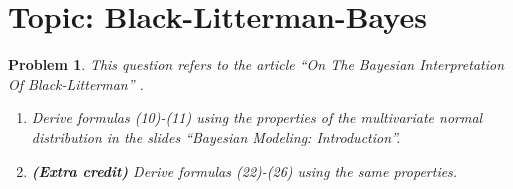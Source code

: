 \documentclass[11pt]{article}
\theoremstyle{plain} %
\newtheorem{problem}[theorem]{Problem}
\theoremstyle{remark}
\begin{document}
\section{Topic: Black-Litterman-Bayes}
\begin{problem}
This question refers to the article ``On The Bayesian Interpretation Of
Black-Litterman'' \cite{Kolm2017}.
\begin{enumerate}[label=(\alph*)]
  \item Derive formulas (10)-(11) using the properties of the multivariate
        normal distribution in the slides ``Bayesian Modeling: Introduction''.
  \item \textbf{(Extra credit)} Derive formulas (22)-(26) using the same
        properties.
\end{enumerate}
\end{problem}
\end{document}
